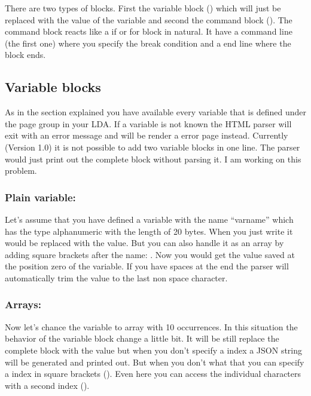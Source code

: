 \documentclass[letterpaper,10pt,english]{sphinxmanual}
\begin{document}
There are two types of blocks. First the variable block () which will just be replaced with the value of the variable and second the command block (). The command block reacts like a if or  for block in natural. It have a command line (the first one) where you specify the break condition and a end line where the block ends.


\subsection{Variable blocks}
\label{html-parser:variable-blocks}
As in the section {\hyperref[natural:template\string-vars]{}} explained you have available every variable that is defined under the page group in your LDA. If a variable is not known the HTML parser will exit with an error message and will be render a error page instead. Currently (Version 1.0) it is not possible to add two variable blocks in one line. The parser would just print out the complete block without parsing it. I am working on this problem.


\subsubsection{Plain variable:}
\label{html-parser:plain-variable}
Let's assume that you have defined a variable with the name ``varname'' which has the type alphanumeric with the length of 20 bytes. When you just write  it would be replaced with the value. But you can also handle it as an array by adding square brackets after the name: . Now you would get the value saved at the position zero of the variable. If you have spaces at the end the parser will automatically trim the value to the last non space character.


\subsubsection{Arrays:}
\label{html-parser:arrays}
Now let's chance the variable to array with 10 occurrences. In this situation the behavior of the variable block change a little bit. It will be still replace the complete block with the value but when you don't specify a index a JSON string will be generated and printed out. But when you don't what that you can specify a index in square brackets (). Even here you can access the individual characters with a second index ().
\end{document}

